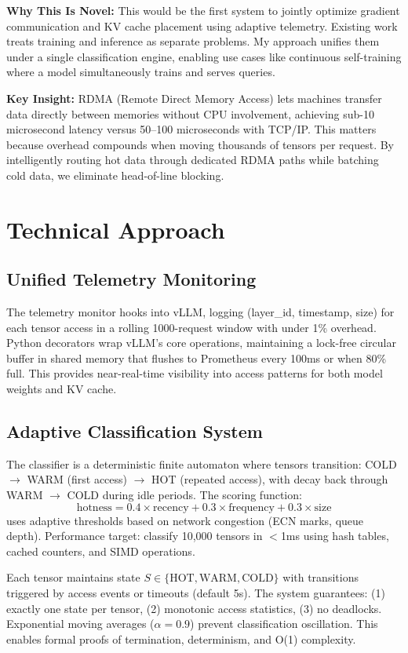 \documentclass[10pt,letterpaper]{article}
\begin{document}
\textbf{Why This Is Novel:} This would be the first system to jointly optimize gradient communication and KV cache placement using adaptive telemetry. Existing work treats training and inference as separate problems. My approach unifies them under a single classification engine, enabling use cases like continuous self-training where a model simultaneously trains and serves queries.

\textbf{Key Insight:} RDMA (Remote Direct Memory Access) lets machines transfer data directly between memories without CPU involvement, achieving sub-10 microsecond latency versus 50--100 microseconds with TCP/IP. This matters because overhead compounds when moving thousands of tensors per request. By intelligently routing hot data through dedicated RDMA paths while batching cold data, we eliminate head-of-line blocking.

\section{Technical Approach}

\subsection{Unified Telemetry Monitoring}
The telemetry monitor hooks into vLLM, logging (layer\_id, timestamp, size) for each tensor access in a rolling 1000-request window with under 1\% overhead. Python decorators wrap vLLM's core operations, maintaining a lock-free circular buffer in shared memory that flushes to Prometheus every 100ms or when 80\% full. This provides near-real-time visibility into access patterns for both model weights and KV cache.

\subsection{Adaptive Classification System}
The classifier is a deterministic finite automaton where tensors transition: COLD $\rightarrow$ WARM (first access) $\rightarrow$ HOT (repeated access), with decay back through WARM $\rightarrow$ COLD during idle periods. The scoring function:
\[
\text{hotness} = 0.4 \times \text{recency} + 0.3 \times \text{frequency} + 0.3 \times \text{size}
\]
uses adaptive thresholds based on network congestion (ECN marks, queue depth). Performance target: classify 10,000 tensors in $<$1ms using hash tables, cached counters, and SIMD operations.

Each tensor maintains state $S \in \{\text{HOT}, \text{WARM}, \text{COLD}\}$ with transitions triggered by access events or timeouts (default 5s). The system guarantees: (1) exactly one state per tensor, (2) monotonic access statistics, (3) no deadlocks. Exponential moving averages ($\alpha = 0.9$) prevent classification oscillation. This enables formal proofs of termination, determinism, and O(1) complexity.
\end{document}
